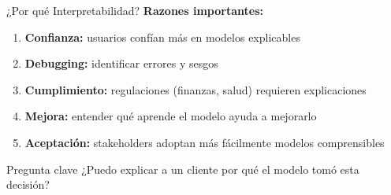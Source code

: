 \documentclass[aspectratio=169]{beamer}
\begin{document}
\begin{frame}{¿Por qué Interpretabilidad?}
\textbf{Razones importantes:}

\begin{enumerate}
\item \textbf{Confianza:} usuarios confían más en modelos explicables
\item \textbf{Debugging:} identificar errores y sesgos
\item \textbf{Cumplimiento:} regulaciones (finanzas, salud) requieren explicaciones
\item \textbf{Mejora:} entender qué aprende el modelo ayuda a mejorarlo
\item \textbf{Aceptación:} stakeholders adoptan más fácilmente modelos comprensibles
\end{enumerate}

\vspace{0.3cm}

\begin{alertblock}{Pregunta clave}
¿Puedo explicar a un cliente por qué el modelo tomó esta decisión?
\end{alertblock}
\end{frame}
\end{document}
